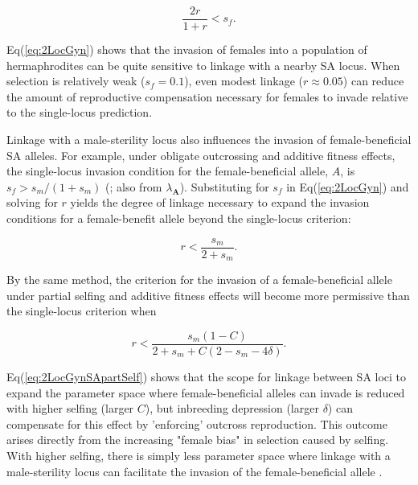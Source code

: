 \documentclass[9pt,twocolumn,twoside,lineno]{gsajnl}
\begin{document}
\begin{equation}\label{eq:2LocGyn}
	\frac{2 r}{1 + r} < s_f.
\end{equation}

\noindent Eq(\ref{eq:2LocGyn}) shows that the invasion of females into a population of hermaphrodites can be quite sensitive to linkage with a nearby SA locus. When selection is relatively weak ($s_f = 0.1$), even modest linkage ($r\approx0.05$) can reduce the amount of reproductive compensation necessary for females to invade relative to the single-locus prediction. 

Linkage with a male-sterility locus also influences the invasion of female-beneficial SA alleles. For example, under obligate outcrossing and additive fitness effects, the single-locus invasion condition for the female-beneficial allele, $A$, is $s_f > s_m / (1+s_m)$ (\citealt{Kidwell1977}; also from $\lambda_{\mathbf{A}}$). Substituting for $s_f$ in Eq(\ref{eq:2LocGyn}) and solving for $r$ yields the degree of linkage necessary to expand the invasion conditions for a female-benefit allele beyond the single-locus criterion:

\begin{equation}\label{eq:2LocGynSA}
	r < \frac{s_m}{2 + s_m}.
\end{equation}

\noindent By the same method, the criterion for the invasion of a female-beneficial allele under partial selfing and additive fitness effects will become more permissive than the single-locus criterion when

\begin{equation}\label{eq:2LocGynSApartSelf}
	r < \frac{s_m (1 - C)}{2 + s_m +C (2 - s_m - 4 \delta)}.
\end{equation}

\noindent Eq(\ref{eq:2LocGynSApartSelf}) shows that the scope for linkage between SA loci to expand the parameter space where female-beneficial alleles can invade is reduced with higher selfing (larger $C$), but inbreeding depression (larger $\delta$) can compensate for this effect by 'enforcing' outcross reproduction. This outcome arises directly from the increasing "female bias" in selection caused by selfing. With higher selfing, there is simply less parameter space where linkage with a male-sterility locus can facilitate the invasion of the female-beneficial allele \citep{JordanConnallon2014,Olito2016}.


\end{document}
